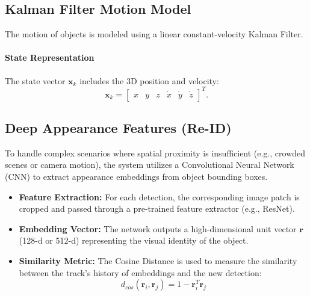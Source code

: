 \documentclass[12pt,a4paper]{report}
\begin{document}
{\subsection{Kalman Filter Motion Model}
The motion of objects is modeled using a linear constant-velocity Kalman Filter.
\paragraph{State Representation}
The state vector $\mathbf{x}_k$ includes the 3D position and velocity:
\begin{equation}
\mathbf{x}_k=
\begin{bmatrix}
x & y & z & \dot{x} & \dot{y} & \dot{z}
\end{bmatrix}^T.
\end{equation}

\subsection{Deep Appearance Features (Re-ID)}
To handle complex scenarios where spatial proximity is insufficient (e.g., crowded scenes or camera motion), the system utilizes a Convolutional Neural Network (CNN) to extract appearance embeddings from object bounding boxes.
\begin{itemize}
    \item \textbf{Feature Extraction:} For each detection, the corresponding image patch is cropped and passed through a pre-trained feature extractor (e.g., ResNet).
    \item \textbf{Embedding Vector:} The network outputs a high-dimensional unit vector $\mathbf{r}$ (128-d or 512-d) representing the visual identity of the object.
    \item \textbf{Similarity Metric:} The Cosine Distance is used to measure the similarity between the track's history of embeddings and the new detection:
    \begin{equation}
    d_{cos}(\mathbf{r}_i, \mathbf{r}_j) = 1 - \mathbf{r}_i^T \mathbf{r}_j
    \end{equation}
\end{itemize}

}
\end{document}
